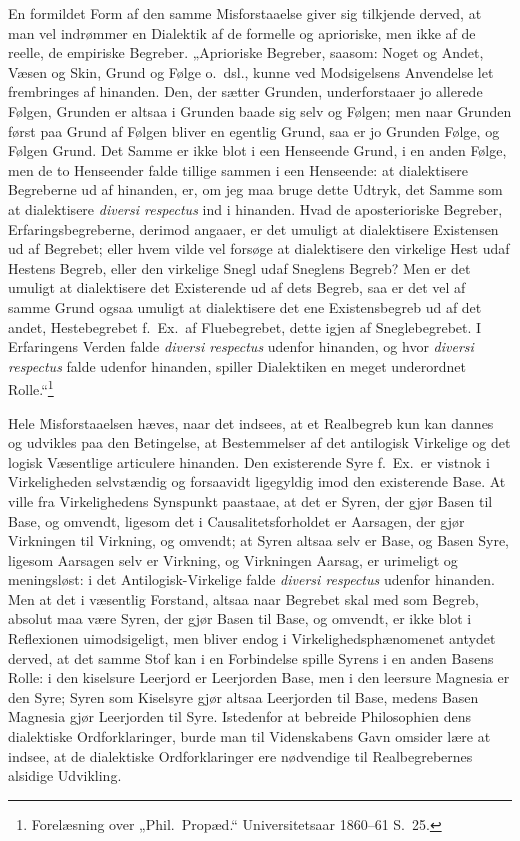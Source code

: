 \documentclass[12pt]{book}
\newcommand{\opage}[1]{\marginnote{\footnotesize\textit{[#1]}}}
\begin{document}
En formildet Form af den samme Misforstaaelse giver sig tilkjende derved, at man vel indrømmer en Dialektik af de formelle og aprioriske, men ikke af de reelle, de empiriske Begreber. „Aprioriske Begreber, saasom: Noget og Andet, Væsen og Skin, Grund og Følge o.\ dsl., kunne ved Modsigelsens Anvendelse let frembringes af hinanden. Den, der sætter Grunden, underforstaaer jo allerede Følgen, Grunden er altsaa i Grunden baade sig selv og Følgen; men naar Grunden først paa Grund af Følgen bliver en egentlig Grund, saa er jo Grunden Følge, og Følgen Grund. Det Samme er ikke blot i een Henseende Grund, i en anden Følge, men de to Henseender falde tillige sammen i een Henseende: at dialektisere Begreberne ud af hinanden, er, om jeg maa bruge dette Udtryk, det Samme som at dialektisere \textit{diversi respectus} ind i hinanden. Hvad de aposterioriske Begreber, Erfaringsbegreberne, derimod angaaer, er det umuligt at dialektisere Existensen ud af Begrebet; eller hvem vilde vel forsøge at dialektisere den virkelige Hest udaf Hestens Begreb, eller den virkelige Snegl udaf Sneglens Begreb? Men er det umuligt at dialektisere det Existerende ud af dets Begreb, saa er det vel af samme Grund ogsaa umuligt at dialektisere det ene Existensbegreb ud af det andet, Hestebegrebet f.\ Ex.\ af Fluebegrebet, dette igjen af Sneglebegrebet. I Erfaringens Verden falde \textit{diversi respectus} udenfor hinanden, og hvor \textit{diversi respectus} falde udenfor hinanden, spiller Dialektiken en meget underordnet Rolle.“\footnote{Forelæsning over „Phil.\ Propæd.“ Universitetsaar 1860--61 S.~25.}%

Hele Misforstaaelsen hæves, naar det indsees, at et Realbegreb kun kan dannes og udvikles paa den Betingelse, at Bestemmelser af det antilogisk Virkelige og det logisk Væsentlige articulere hinanden. Den existerende Syre f.\ Ex.\ er
\opage{9}vistnok i Virkeligheden selvstændig og forsaavidt ligegyldig imod den existerende Base. At ville fra Virkelighedens Synspunkt paastaae, at det er Syren, der gjør Basen til Base, og omvendt, ligesom det i Causalitetsforholdet er Aarsagen, der gjør Virkningen til Virkning, og omvendt; at Syren altsaa selv er Base, og Basen Syre, ligesom Aarsagen selv er Virkning, og Virkningen Aarsag, er urimeligt og meningsløst: i det Antilogisk-Virkelige falde \textit{diversi respectus} udenfor hinanden. Men at det i væsentlig Forstand, altsaa naar Begrebet skal med som Begreb, absolut maa være Syren, der gjør Basen til Base, og omvendt, er ikke blot i Reflexionen uimodsigeligt, men bliver endog i Virkelighedsphænomenet antydet derved, at det samme Stof kan i en Forbindelse spille Syrens i en anden Basens Rolle: i den kiselsure Leerjord er Leerjorden Base, men i den leersure Magnesia er den Syre; Syren som Kiselsyre gjør altsaa Leerjorden til Base, medens Basen Magnesia gjør Leerjorden til Syre. Istedenfor at bebreide Philosophien dens dialektiske Ordforklaringer, burde man til Videnskabens Gavn omsider lære at indsee, at de dialektiske Ordforklaringer ere nødvendige til Realbegrebernes alsidige Udvikling.
\end{document}
